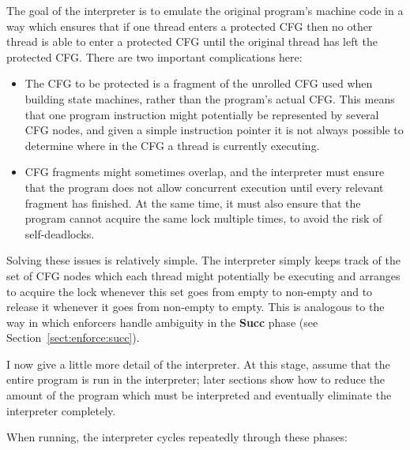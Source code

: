 The goal of the interpreter is to emulate the original program's
machine code in a way which ensures that if one thread enters a
protected CFG then no other thread is able to enter a protected CFG
until the original thread has left the protected CFG.  There are two
important complications here:
                                                                                                                                                                             
\begin{itemize}
\item The CFG to be protected is a fragment of the unrolled CFG used
  when building state machines, rather than the program's actual CFG.
  This means that one program instruction might potentially be
  represented by several CFG nodes, and given a simple instruction
  pointer it is not always possible to determine where in the CFG a
  thread is currently executing.

\item CFG fragments might sometimes overlap, and the interpreter must
  ensure that the program does not allow concurrent execution until
  every relevant fragment has finished.  At the same time, it must
  also ensure that the program cannot acquire the same lock multiple
  times, to avoid the risk of self-deadlocks.
\end{itemize}

Solving these issues is relatively simple.  The interpreter simply
keeps track of the set of CFG nodes which each thread might
potentially be executing and arranges to acquire the lock whenever
this set goes from empty to non-empty and to release it whenever it
goes from non-empty to empty.  This is analogous to the way in which
enforcers handle ambiguity in the \textbf{Succ} phase (see
Section~\ref{sect:enforce:succ}).

I now give a little more detail of the interpreter.  At this stage,
assume that the entire program is run in the interpreter; later
sections show how to reduce the amount of the program which must be
interpreted and eventually eliminate the interpreter completely.

When running, the interpreter cycles repeatedly through these phases:

